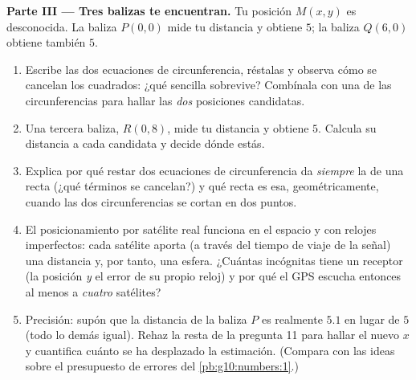 \begin{problem}
\medskip
\noindent\textbf{Parte III --- Tres balizas te encuentran.}
Tu posición $M(x, y)$ es desconocida. La baliza $P(0, 0)$ mide tu
distancia y obtiene $5$; la baliza $Q(6, 0)$ obtiene también $5$.
\begin{enumerate}[resume]
  \item Escribe las dos ecuaciones de circunferencia, réstalas y observa
        cómo se cancelan los cuadrados: ¿qué  sencilla sobrevive?
        Combínala con una de las circunferencias para hallar las
        \emph{dos} posiciones candidatas.
  \item Una tercera baliza, $R(0, 8)$, mide tu distancia y obtiene $5$.
        Calcula su distancia a cada candidata y decide dónde estás.
  \item Explica por qué restar dos ecuaciones de circunferencia da
        \emph{siempre} la  de una recta (¿qué términos se
        cancelan?) y qué recta es esa, geométricamente, cuando las dos
        circunferencias se cortan en dos puntos.
  \item El posicionamiento por satélite real funciona en el espacio y con
        relojes imperfectos: cada satélite aporta (a través del tiempo de
        viaje de la señal) una distancia y, por tanto, una esfera.
        ¿Cuántas incógnitas tiene un receptor (la posición \emph{y} el
        error de su propio reloj) y por qué el GPS escucha entonces al
        menos a \emph{cuatro} satélites?
  \item Precisión: supón que la distancia de la baliza $P$ es realmente
        $5.1$ en lugar de $5$ (todo lo demás igual). Rehaz la resta de la
        pregunta 11 para hallar el nuevo $x$ y cuantifica cuánto se ha
        desplazado la estimación. (Compara con las ideas sobre el
        presupuesto de errores del \cref{pb:g10:numbers:1}.)
\end{enumerate}


\end{problem}
